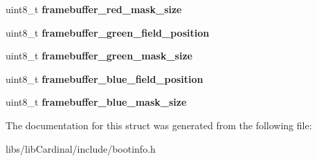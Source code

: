 \begin{DoxyCompactItemize}
\item 
uint8\+\_\+t {\bfseries framebuffer\+\_\+red\+\_\+mask\+\_\+size}\hypertarget{structCardinalBootInfo_a3cafd0d8a654feb774f389efc036ec58}{}\label{structCardinalBootInfo_a3cafd0d8a654feb774f389efc036ec58}

\item 
uint8\+\_\+t {\bfseries framebuffer\+\_\+green\+\_\+field\+\_\+position}\hypertarget{structCardinalBootInfo_a4fdc400fdbbbb5bfbc8055ff5636b8f1}{}\label{structCardinalBootInfo_a4fdc400fdbbbb5bfbc8055ff5636b8f1}

\item 
uint8\+\_\+t {\bfseries framebuffer\+\_\+green\+\_\+mask\+\_\+size}\hypertarget{structCardinalBootInfo_a33d86d88d3cc899104936f35e7c330a4}{}\label{structCardinalBootInfo_a33d86d88d3cc899104936f35e7c330a4}

\item 
uint8\+\_\+t {\bfseries framebuffer\+\_\+blue\+\_\+field\+\_\+position}\hypertarget{structCardinalBootInfo_aced9c7f005b5bc2b5d9aa2aecd78b342}{}\label{structCardinalBootInfo_aced9c7f005b5bc2b5d9aa2aecd78b342}

\item 
uint8\+\_\+t {\bfseries framebuffer\+\_\+blue\+\_\+mask\+\_\+size}\hypertarget{structCardinalBootInfo_a7322a56a4dc15056c4fa7d0e4de0e6b7}{}\label{structCardinalBootInfo_a7322a56a4dc15056c4fa7d0e4de0e6b7}

\end{DoxyCompactItemize}


The documentation for this struct was generated from the following file\+:\begin{DoxyCompactItemize}
\item 
libs/lib\+Cardinal/include/bootinfo.\+h\end{DoxyCompactItemize}
